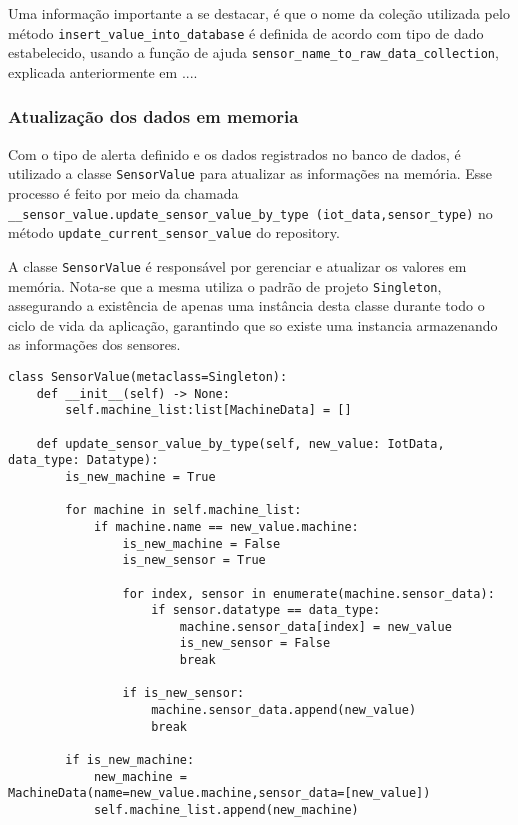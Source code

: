 Uma informação importante a se destacar, é que o nome da coleção utilizada pelo método \texttt{insert\_value\_into\_database} é definida de acordo com tipo de dado estabelecido, usando a função de ajuda \texttt{sensor\_name\_to\_raw\_data\_collection}, explicada anteriormente em ....

\subsubsection{Atualização dos dados em memoria}

Com o tipo de alerta definido e os dados registrados no banco de dados, é utilizado a classe \texttt{SensorValue} para atualizar as informações na memória. Esse processo é feito por meio da chamada \texttt{\_\_sensor\_value.update\_sensor\_value\_by\_type (iot\_data,sensor\_type)} no método \texttt{update\_current\_sensor\_value} do repository.


A classe \texttt{SensorValue} é responsável por gerenciar e atualizar os valores em memória. Nota-se que a mesma utiliza o padrão de projeto \texttt{Singleton}, assegurando a existência de apenas uma instância desta classe durante todo o ciclo de vida da aplicação, garantindo que so existe uma instancia armazenando as informações dos sensores.

\begin{verbatim}
class SensorValue(metaclass=Singleton):
    def __init__(self) -> None:
        self.machine_list:list[MachineData] = []

    def update_sensor_value_by_type(self, new_value: IotData, data_type: Datatype):
        is_new_machine = True

        for machine in self.machine_list:
            if machine.name == new_value.machine:
                is_new_machine = False
                is_new_sensor = True

                for index, sensor in enumerate(machine.sensor_data):
                    if sensor.datatype == data_type:
                        machine.sensor_data[index] = new_value
                        is_new_sensor = False
                        break

                if is_new_sensor:
                    machine.sensor_data.append(new_value)
                    break

        if is_new_machine:
            new_machine = MachineData(name=new_value.machine,sensor_data=[new_value])
            self.machine_list.append(new_machine)
\end{verbatim}

